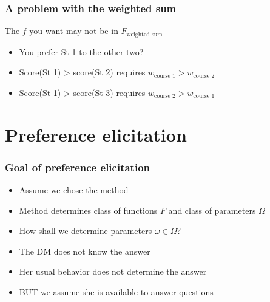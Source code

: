 \documentclass[french,english]{beamer}
\begin{document}
\begin{frame}
	\frametitle{A problem with the weighted sum}
	The $f$ you want may not be in $F_\text{weighted sum}$
	\begin{itemize}
		\item You prefer St 1 to the other two?
		\item Score(St 1) > score(St 2) requires $w_\text{course 1} > w_\text{course 2}$
		\item Score(St 1) > score(St 3) requires $w_\text{course 2} > w_\text{course 1}$
	\end{itemize}
	\begin{center}
	\end{center}
\end{frame}

\section{Preference elicitation}
\begin{frame}
	\frametitle{Goal of preference elicitation}
	\begin{itemize}
		\item Assume we chose the method
		\item Method determines class of functions $F$ and class of parameters $\Omega$
		\item How shall we determine parameters $\omega \in \Omega$?
		\item The \ac{DM} does not know the answer
		\item Her usual behavior does not determine the answer
		\item BUT we assume she is available to answer questions
	\end{itemize}
\end{frame}
\end{document}
